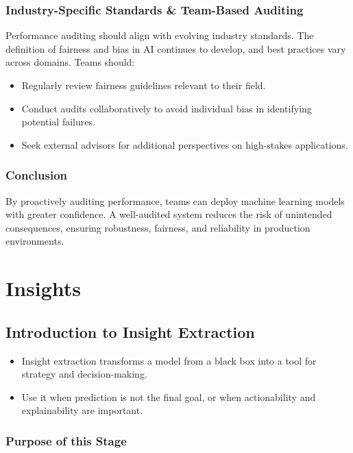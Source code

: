 \documentclass[12pt,openany]{book}
\begin{document}
\section{Industry-Specific Standards \& Team-Based Auditing}
Performance auditing should align with evolving industry standards. The definition of fairness and bias in AI continues to develop, and best practices vary across domains. Teams should:
\begin{itemize}
    \item Regularly review fairness guidelines relevant to their field.
    \item Conduct audits collaboratively to avoid individual bias in identifying potential failures.
    \item Seek external advisors for additional perspectives on high-stakes applications.
\end{itemize}

\section{Conclusion}
By proactively auditing performance, teams can deploy machine learning models with greater confidence. A well-audited system reduces the risk of unintended consequences, ensuring robustness, fairness, and reliability in production environments.




\part{Insights}


\chapter{Introduction to Insight Extraction}

\begin{summarybox}
\begin{itemize}
  \item Insight extraction transforms a model from a black box into a tool for strategy and decision-making.
  \item Use it when prediction is not the final goal, or when actionability and explainability are important.
\end{itemize}
\end{summarybox}

\section{Purpose of this Stage}
\end{document}
